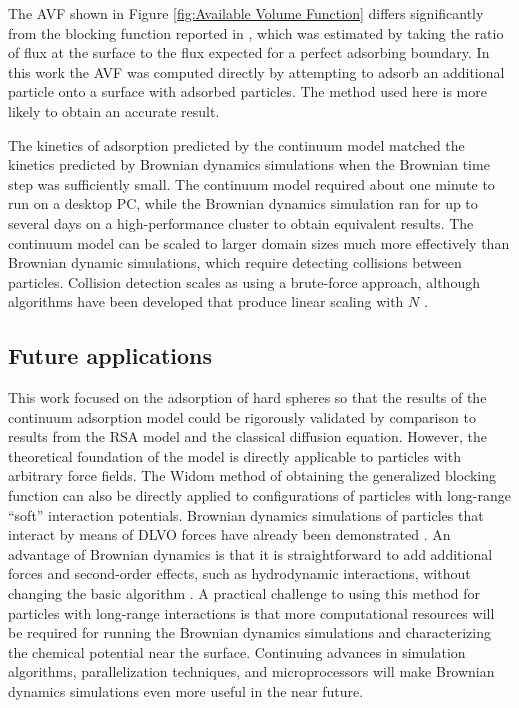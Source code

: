 The AVF shown in Figure \ref{fig:Available Volume Function} differs
significantly from the blocking function reported in \cite{Magan2004},
which was estimated by taking the ratio of flux at the surface to
the flux expected for a perfect adsorbing boundary. In this work the
AVF was computed directly by attempting to adsorb an additional particle
onto a surface with adsorbed particles. The method used here is more
likely to obtain an accurate result.

The kinetics of adsorption predicted by the continuum model matched
the kinetics predicted by Brownian dynamics simulations when the Brownian
time step was sufficiently small. The continuum model required about
one minute to run on a desktop PC, while the Brownian dynamics simulation
ran for up to several days on a high-performance cluster to obtain
equivalent results. The continuum model can be scaled to larger domain
sizes much more effectively than Brownian dynamic simulations, which
require detecting collisions between particles. Collision detection
scales as using a brute-force approach, although algorithms have been
developed that produce linear scaling with $N$ \cite{Taylor2010}.


\subsection{Future applications}

This work focused on the adsorption of hard spheres so that the results
of the continuum adsorption model could be rigorously validated by
comparison to results from the RSA model and the classical diffusion
equation. However, the theoretical foundation of the model is directly
applicable to particles with arbitrary force fields. The Widom method
of obtaining the generalized blocking function can also be directly
applied to configurations of particles with long-range {}``soft''
interaction potentials. Brownian dynamics simulations of particles
that interact by means of DLVO forces have already been demonstrated
\cite{Magan2006,Quinn2008,Unni2005}. An advantage of Brownian dynamics
is that it is straightforward to add additional forces and second-order
effects, such as hydrodynamic interactions, without changing the basic
algorithm \cite{Unni2005}. A practical challenge to using this method
for particles with long-range interactions is that more computational
resources will be required for running the Brownian dynamics simulations
and characterizing the chemical potential near the surface. Continuing
advances in simulation algorithms, parallelization techniques, and
microprocessors will make Brownian dynamics simulations even more
useful in the near future. 


